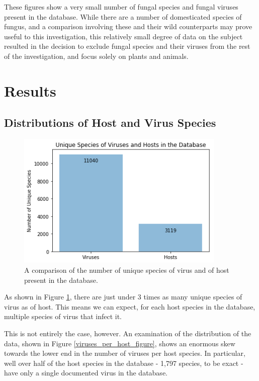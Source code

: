 \documentclass[12pt]{article}
\begin{document}
    These figures show a very small number of fungal species and fungal viruses
    present in the database. While there are a number of domesticated species of
    fungus, and a comparison involving these and their wild counterparts may
    prove useful to this investigation, this relatively small degree of data
    on the subject resulted in the decision to exclude fungal species and their
    viruses from the rest of the investigation, and focus solely on plants and
    animals.

    \section{Results}

    \subsection{Distributions of Host and Virus Species}

    \begin{figure}[H]
        \begin{center}
            \includegraphics[width=100mm]{unique_species_figure.png}
            \caption{A comparison of the number of unique species of virus and of
            host present in the database.}
            \label{unique_species_figure}
        \end{center}
    \end{figure}

    As shown in Figure \ref{unique_species_figure}, there are just under 3
    times as many unique species of virus as of host. This means we can expect,
    for each host species in the database, multiple species of virus that infect
    it.

    This is not entirely the case, however. An examination of the distribution of
    the data, shown in Figure \ref{viruses_per_host_figure}, shows an enormous skew
    towards the lower end in the number of viruses per host species. In particular,
    well over half of the host species in the database - 1,797 species, to be exact -
    have only a single documented virus in the database.
    
\end{document}
